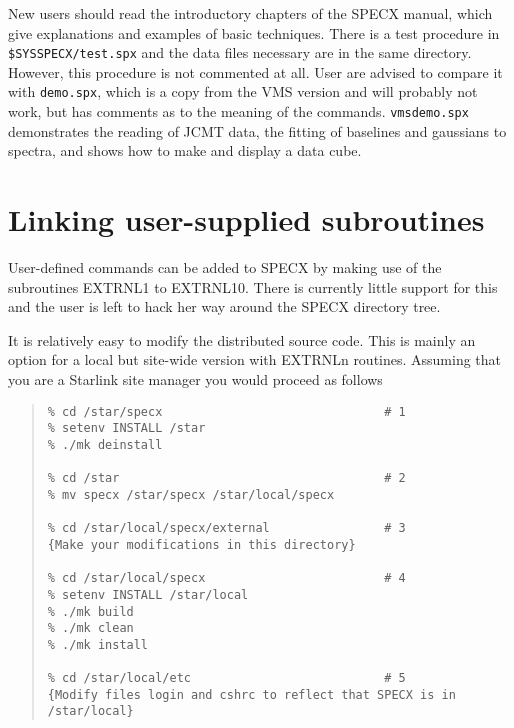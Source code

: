 \documentclass[twoside,11pt]{article}
\renewcommand{\_}{\texttt{\symbol{95}}}
\newenvironment{myquote}{\begin{quote}\begin{small}}{\end{small}\end{quote}}
\begin{document}
New users should read the introductory chapters of the SPECX manual,
which give explanations and examples of basic techniques. There is a
test procedure in {\tt \$SYS\_SPECX/test.spx} and the data files
necessary are in the same directory. However, this procedure is not
commented at all. User are advised to compare it with {\tt demo.spx},
which is a copy from the VMS version and will probably not work, but has
comments as to the meaning of the commands.
{\tt vms\_demo.spx} demonstrates the reading of JCMT data,
the fitting of baselines and gaussians to spectra, and shows how to make
and display a data cube.


\section{Linking user-supplied subroutines}

User-defined commands can be added to SPECX by making use of the
subroutines EXTRNL1 to EXTRNL10. There is currently little support for
this and the user is left to hack her way around the SPECX directory
tree.

It is relatively easy to modify the distributed source code. This is
mainly an option for a local but site-wide version with EXTRNLn
routines. Assuming that you are a Starlink site manager you would
proceed as follows

\begin{myquote}
\begin{verbatim}
% cd /star/specx                               # 1
% setenv INSTALL /star
% ./mk deinstall

% cd /star                                     # 2
% mv specx /star/specx /star/local/specx

% cd /star/local/specx/external                # 3
{Make your modifications in this directory}

% cd /star/local/specx                         # 4
% setenv INSTALL /star/local
% ./mk build
% ./mk clean
% ./mk install

% cd /star/local/etc                           # 5
{Modify files login and cshrc to reflect that SPECX is in /star/local}
\end{verbatim}
\end{myquote}
\end{document}

